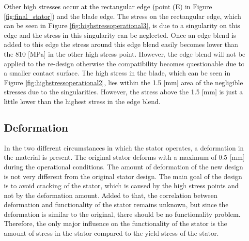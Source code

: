 Other high stresses occur at the rectangular edge (point (E) in Figure \ref{fig:final_stator}) and the blade edge. The stress on the rectangular edge, which can be seen in Figure \ref{fig:highstressoperational3}, is due to a singularity on this edge and the stress in this singularity can be neglected. Once an edge blend is added to this edge the stress around this edge blend easily becomes lower than the 810 [MPa] in the other high stress point. However, the edge blend will not be applied to the re-design otherwise the compatibility becomes questionable due to a smaller contact surface. The high stress in the blade, which can be seen in Figure \ref{fig:highstressoperational2}, lies within the 1.5 [mm] area of the negligible stresses due to the singularities. However, the stress above the 1.5 [mm] is just a little lower than the highest stress in the edge blend.

\subsection{Deformation}
In the two different circumstances in which the stator operates, a deformation in the material is present. The original stator deforms with a maximum of 0.5 [mm] during the operational conditions. The amount of deformation of the new design is not very different from the original stator design. The main goal of the design is to avoid cracking of the stator, which is caused by the high stress points and not by the deformation amount. Added to that, the correlation between deformation and functionality of the stator remains unknown, but since the deformation is similar to the original, there should be no functionality problem. Therefore, the only major influence on the functionality of the stator is  the amount of stress in the stator compared to the yield stress of the stator.



 
















\newpage